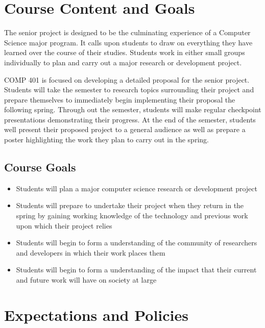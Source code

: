 \documentclass[10pt]{article}
\begin{document}
\section{Course Content and Goals}

The senior project is designed to be the culminating experience of a Computer Science major program.  It calls upon students to draw on everything they have learned over the course of their studies. Students work in either small groups individually to plan and carry out a major research or development project.  

COMP 401 is focused on developing a detailed proposal for the senior project. Students will take the semester to research topics surrounding their project and prepare themselves to immediately begin implementing their proposal the following spring.  Through out the semester, students will make regular checkpoint presentations demonstrating their progress.  At the end of the semester, students well present their proposed project to a general audience as well as prepare a poster highlighting the work they plan to carry out in the spring. 

\subsection{Course Goals}
\begin{itemize}
\item Students will plan a major computer science research or development project
\item Students will prepare to undertake their project when they return in the spring by gaining working knowledge of the technology and previous work upon which their project relies
\item Students will begin to form a understanding of the community of researchers and developers in which their work places them
\item Students will begin to form a understanding of the impact that their current and future work will have on society at large 
\end{itemize}

\section{Expectations and Policies}
\end{document}
